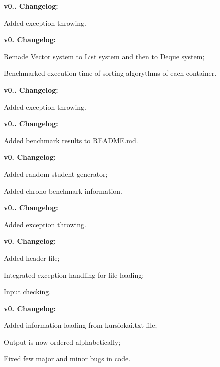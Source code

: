 {\bfseries{v0.. Changelog\+:}}
\begin{DoxyItemize}
\item Added exception throwing.
\end{DoxyItemize}

{\bfseries{v0. Changelog\+:}}
\begin{DoxyItemize}
\item Remade Vector system to List system and then to Deque system;
\item Benchmarked execution time of sorting algorythms of each container.
\end{DoxyItemize}

{\bfseries{v0.. Changelog\+:}}
\begin{DoxyItemize}
\item Added exception throwing.
\end{DoxyItemize}

{\bfseries{v0.. Changelog\+:}}
\begin{DoxyItemize}
\item Added benchmark results to \mbox{\hyperlink{_r_e_a_d_m_e_8md}{R\+E\+A\+D\+M\+E.\+md}}.
\end{DoxyItemize}

{\bfseries{v0. Changelog\+:}}
\begin{DoxyItemize}
\item Added random student generator;
\item Added chrono benchmark information.
\end{DoxyItemize}

{\bfseries{v0.. Changelog\+:}}
\begin{DoxyItemize}
\item Added exception throwing.
\end{DoxyItemize}

{\bfseries{v0. Changelog\+:}}
\begin{DoxyItemize}
\item Added header file;
\item Integrated exception handling for file loading;
\item Input checking.
\end{DoxyItemize}

{\bfseries{v0. Changelog\+:}}
\begin{DoxyItemize}
\item Added information loading from kursiokai.\+txt file;
\item Output is now ordered alphabetically;
\item Fixed few major and minor bugs in code.
\end{DoxyItemize}

